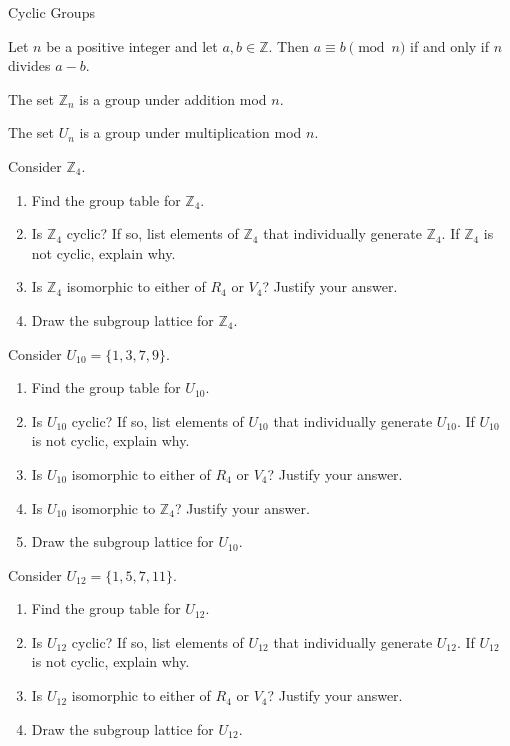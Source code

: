 \begin{section}{Cyclic Groups}
\begin{theorem}
Let $n$ be a positive integer and let $a,b\in\mathbb{Z}$. Then $a\equiv b\pmod n$ if and only if $n$ divides $a-b$.
\end{theorem}

\begin{theorem}
The set $\mathbb{Z}_n$ is a group under addition mod $n$.  
\end{theorem}

\begin{theorem}
The set $U_n$ is a group under multiplication mod $n$.  
\end{theorem}

\begin{problem}
Consider $\mathbb{Z}_4$.
\begin{enumerate}[label=\rm{(\alph*)}]
\item Find the group table for $\mathbb{Z}_4$.
\item Is $\mathbb{Z}_4$ cyclic? If so, list elements of $\mathbb{Z}_4$ that individually generate $\mathbb{Z}_4$.  If $\mathbb{Z}_4$ is not cyclic, explain why.
\item Is $\mathbb{Z}_4$ isomorphic to either of $R_4$ or $V_4$? Justify your answer.
\item Draw the subgroup lattice for $\mathbb{Z}_4$.
\end{enumerate}
\end{problem}

\begin{problem}\label{prob:U10}
Consider $U_{10}=\{1,3,7,9\}$.
\begin{enumerate}[label=\rm{(\alph*)}]
\item Find the group table for $U_{10}$.
\item Is $U_{10}$ cyclic? If so, list elements of $U_{10}$ that individually generate $U_{10}$.  If $U_{10}$ is not cyclic, explain why.
\item Is $U_{10}$ isomorphic to either of $R_4$ or $V_4$? Justify your answer.
\item Is $U_{10}$ isomorphic to $\mathbb{Z}_4$? Justify your answer.
\item Draw the subgroup lattice for $U_{10}$.
\end{enumerate}
\end{problem}

\begin{problem}\label{prob:U12}
Consider $U_{12}=\{1,5,7,11\}$.
\begin{enumerate}[label=\rm{(\alph*)}]
\item Find the group table for $U_{12}$.
\item Is $U_{12}$ cyclic? If so, list elements of $U_{12}$ that individually generate $U_{12}$.  If $U_{12}$ is not cyclic, explain why.
\item Is $U_{12}$ isomorphic to either of $R_4$ or $V_4$? Justify your answer.
\item Draw the subgroup lattice for $U_{12}$.
\end{enumerate}
\end{problem}


\end{section}
